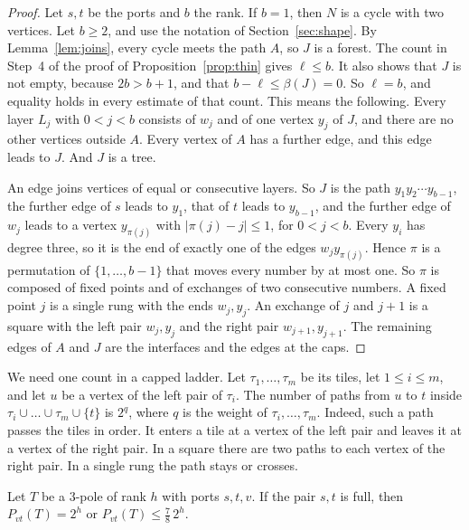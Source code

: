 \begin{proof}
Let $s,t$ be the ports and $b$ the rank. If $b=1$, then $N$ is a cycle with two vertices. Let
$b\ge2$, and use the notation of Section~\ref{sec:shape}. By Lemma~\ref{lem:joins}, every cycle
meets the path $A$, so $J$ is a forest. The count in Step~4 of the proof of
Proposition~\ref{prop:thin} gives $\ell\le b$. It also shows that $J$ is not empty, because
$2b>b+1$, and that $b-\ell\le\beta(J)=0$. So $\ell=b$, and equality holds in every estimate of
that count. This means the following. Every layer $L_j$ with $0<j<b$ consists of $w_j$ and of one
vertex $y_j$ of $J$, and there are no other vertices outside $A$. Every vertex of $A$ has a
further edge, and this edge leads to $J$. And $J$ is a tree.

An edge joins vertices of equal or consecutive layers. So $J$ is the path
$y_1y_2\cdots y_{b-1}$, the further edge of $s$ leads to $y_1$, that of $t$ leads to $y_{b-1}$,
and the further edge of $w_j$ leads to a vertex $y_{\pi(j)}$ with $|\pi(j)-j|\le1$, for $0<j<b$.
Every $y_i$ has degree three, so it is the end of exactly one of the edges $w_jy_{\pi(j)}$. Hence
$\pi$ is a permutation of $\{1,\dots,b-1\}$ that moves every number by at most one. So $\pi$ is
composed of fixed points and of exchanges of two consecutive numbers. A fixed point $j$ is a
single rung with the ends $w_j,y_j$. An exchange of $j$ and $j+1$ is a square with the left pair
$w_j,y_j$ and the right pair $w_{j+1},y_{j+1}$. The remaining edges of $A$ and $J$ are the
interfaces and the edges at the caps.
\end{proof}

We need one count in a capped ladder. Let $\tau_1,\dots,\tau_m$ be its tiles, let
$1\le i\le m$, and let $u$ be a vertex of the left pair of $\tau_i$. The number of paths from $u$ to
$t$ inside $\tau_i\cup\dots\cup\tau_m\cup\{t\}$ is $2^{q}$, where $q$ is the weight of
$\tau_i,\dots,\tau_m$. Indeed, such a path passes the tiles in order. It enters a tile at a vertex
of the left pair and leaves it at a vertex of the right pair. In a square there are two paths to
each vertex of the right pair. In a single rung the path stays or crosses.

\begin{lemma}\label{lem:thirdport}
Let $T$ be a $3$-pole of rank $h$ with ports $s,t,v$. If the pair $s,t$ is full, then
$P_{vt}(T)=2^{h}$ or $P_{vt}(T)\le\frac78\,2^{h}$.
\end{lemma}

